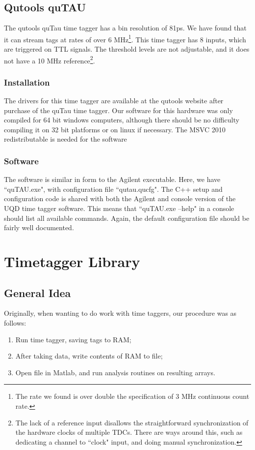 \documentclass[10pt]{article}
\begin{document}
\subsection{Qutools quTAU}
The qutools quTau time tagger has a bin resolution of 81ps. We have found that it can stream tags at rates of over 
6 MHz\footnote{The rate we found is over double the specification of 3 MHz continuous count rate.}. This time tagger has 8 inputs,
which are triggered on TTL signals. The threshold levels are not adjustable, and it does not have a 10 MHz 
reference\footnote{The lack of a reference input disallows the straightforward synchronization of the hardware 
clocks of multiple TDCs. There
are ways around this, such as dedicating a channel to ``clock" input, and doing manual synchronization.}.

\subsubsection{Installation}
The drivers for this time tagger are available at the qutools website after purchase of the quTau time tagger. 
Our software for this hardware was only compiled for 64 bit windows computers, although there should be 
no difficulty compiling it on 32 bit platforms or on linux if necessary. The MSVC 2010 redistributable is needed for the
software


\subsubsection{Software}

The software is similar in form to the Agilent executable. Here, we have ``quTAU.exe", with configuration file ``qutau.qucfg".
The C++ setup and configuration code is shared with both the Agilent and console version of the UQD time tagger software.
This means that ``quTAU.exe --help" in a console should list all available commands. Again, the default configuration file
should be fairly well documented.



\section{Timetagger Library}
\subsection{General Idea}
Originally, when wanting to do work with time taggers, our procedure was as follows:
\begin{enumerate}
\item Run time tagger, saving tags to RAM;
\item After taking data, write contents of RAM to file;
\item Open file in Matlab, and run analysis routines on resulting arrays.
\end{enumerate}
\end{document}
